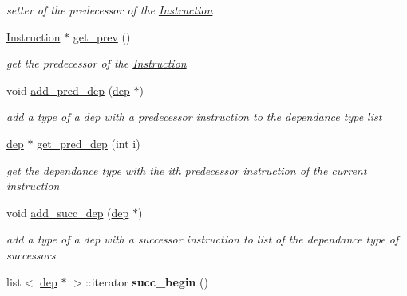 \begin{DoxyCompactItemize}
\begin{DoxyCompactList}\small\item\em setter of the predecessor of the \hyperlink{class_instruction}{Instruction} \end{DoxyCompactList}\item 
\hypertarget{class_instruction_afd6f27235469926b1e7979220495a6f0}{\hyperlink{class_instruction}{Instruction} $\ast$ \hyperlink{class_instruction_afd6f27235469926b1e7979220495a6f0}{get\-\_\-prev} ()}\label{class_instruction_afd6f27235469926b1e7979220495a6f0}

\begin{DoxyCompactList}\small\item\em get the predecessor of the \hyperlink{class_instruction}{Instruction} \end{DoxyCompactList}\item 
\hypertarget{class_instruction_a3121dad231e2b4c27ac3cae6c8627ece}{void \hyperlink{class_instruction_a3121dad231e2b4c27ac3cae6c8627ece}{add\-\_\-pred\-\_\-dep} (\hyperlink{structdep}{dep} $\ast$)}\label{class_instruction_a3121dad231e2b4c27ac3cae6c8627ece}

\begin{DoxyCompactList}\small\item\em add a type of a dep with a predecessor instruction to the dependance type list \end{DoxyCompactList}\item 
\hypertarget{class_instruction_ab32531f8dd490b1c8396b6723f87bfae}{\hyperlink{structdep}{dep} $\ast$ \hyperlink{class_instruction_ab32531f8dd490b1c8396b6723f87bfae}{get\-\_\-pred\-\_\-dep} (int i)}\label{class_instruction_ab32531f8dd490b1c8396b6723f87bfae}

\begin{DoxyCompactList}\small\item\em get the dependance type with the ith predecessor instruction of the current instruction \end{DoxyCompactList}\item 
\hypertarget{class_instruction_acefc258dbcf45c19136dc86e47a82c0e}{void \hyperlink{class_instruction_acefc258dbcf45c19136dc86e47a82c0e}{add\-\_\-succ\-\_\-dep} (\hyperlink{structdep}{dep} $\ast$)}\label{class_instruction_acefc258dbcf45c19136dc86e47a82c0e}

\begin{DoxyCompactList}\small\item\em add a type of a dep with a successor instruction to list of the dependance type of successors \end{DoxyCompactList}\item 
\hypertarget{class_instruction_a2c6f13ddda889e4e2b8b69897de6b733}{list$<$ \hyperlink{structdep}{dep} $\ast$ $>$\-::iterator {\bfseries succ\-\_\-begin} ()}\label{class_instruction_a2c6f13ddda889e4e2b8b69897de6b733}


\end{DoxyCompactItemize}
